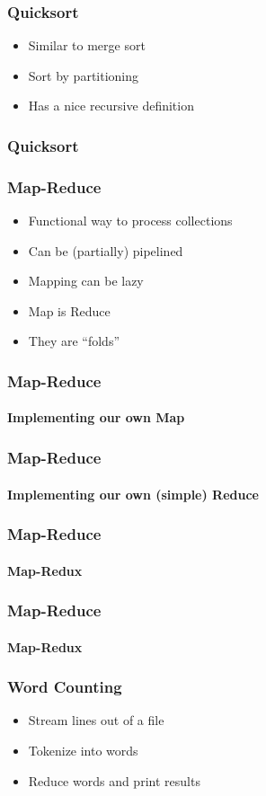 \documentclass[english]{beamer}
\begin{document}
\begin{frame}
\frametitle{Quicksort}
\begin{itemize}
\item{Similar to merge sort}
\item{Sort by partitioning}
\item{Has a nice recursive definition} %
\end{itemize}
\end{frame}

\begin{frame}[fragile]
\frametitle{Quicksort}


\end{frame}

\begin{frame}
\frametitle{Map-Reduce}
\begin{itemize}
\item<1->{Functional way to process collections}
\item<2->{Can be (partially) pipelined}
\item<3->{Mapping can be lazy}
\item<4->{Map is Reduce} %
\item<5->{They are ``folds''}
\end{itemize}
\end{frame}

\begin{frame}[fragile]
\frametitle{Map-Reduce}
\framesubtitle{Implementing our own Map}


\end{frame}

\begin{frame}[fragile]
\frametitle{Map-Reduce}
\framesubtitle{Implementing our own (simple) Reduce}


\end{frame}

\begin{frame}[fragile]
\frametitle{Map-Reduce}
\framesubtitle{Map-Redux}

\end{frame}

\begin{frame}[fragile]
\frametitle{Map-Reduce}
\framesubtitle{Map-Redux}

\end{frame}

\begin{frame}
\frametitle{Word Counting}
\begin{itemize}
\item{Stream lines out of a file}
\item{Tokenize into words}
\item{Reduce words and print results}
\end{itemize}
\end{frame}
\end{document}
